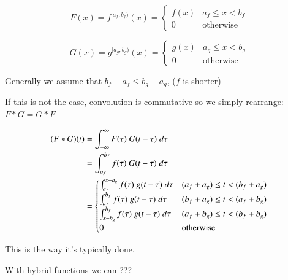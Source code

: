 \begin{equation}
	F(x)=f^{[a_f,b_f)}(x) = 
		\begin{cases}
			f(x) & a_f \leq x < b_f \\
			0 & \text{otherwise}
		\end{cases}
\end{equation}

\begin{equation}
	G(x)=g^{[a_g,b_g)}(x) = 
		\begin{cases}
			g(x) & a_g \leq x < b_g \\
			0 & \text{otherwise}
		\end{cases}
\end{equation}

Generally we assume that $b_f - a_f \leq b_g - a_g$, ($f$ is shorter)

If this is not the case, convolution is commutative so we simply rearrange: $F * G = G * F$

\begin{align}
	(F*G)(t) 
	&= \int_{-\infty}^\infty F(\tau)\; G(t-\tau) \; d\tau \notag \\
	&= \int_{a_f}^{b_f} f(\tau) \; G(t-\tau) \; d\tau \notag \\
	&= 	\begin{cases}
			\int_{a_f}^{x-a_g} f(\tau) \; g(t-\tau) \; d\tau 	& (a_f+a_g) \leq t < (b_f+a_g) \\
			\int_{a_f}^{b_f} f(\tau) \; g(t-\tau) \; d\tau		& (b_f+a_g) \leq t < (a_f+b_g) \\
			\int_{x-b_g}^{b_f} f(\tau) \; g(t-\tau) \; d\tau	& (a_f+b_g) \leq t < (b_f+b_g) \\
			0										& \text{otherwise}
		\end{cases}
\end{align}


This is the way it's typically done.

With hybrid functions we can ???


\newpage